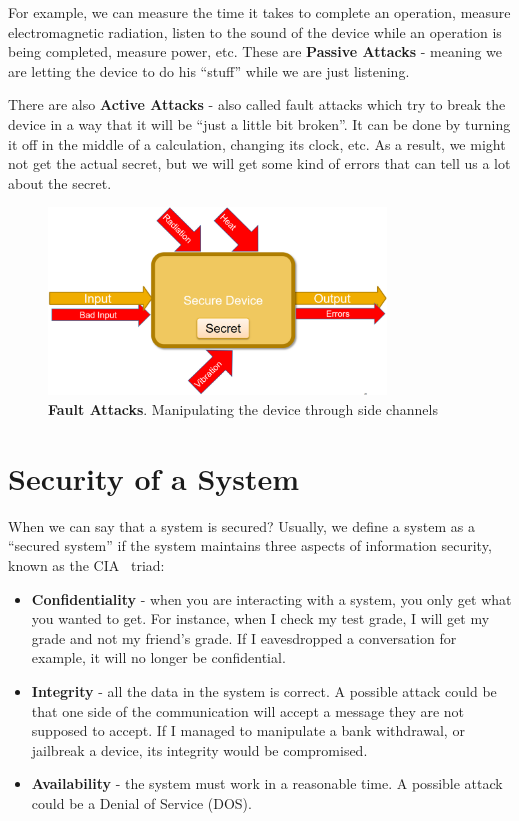 For example, we can measure the time it takes to complete an operation,
measure electromagnetic radiation, listen to the sound of the device while an operation is being completed, measure power, etc. These are \textbf{Passive Attacks} - meaning
we are letting the device to do his ``stuff'' while we are just listening.

There are also \textbf{Active Attacks} - also called fault attacks which try to
break the device in a way that it will be ``just a little bit broken''.
It can be done by turning it off in the middle of a calculation, changing its clock, etc. 
As a result, we might not get the actual secret, but we will get some kind of errors that can tell us a lot about the secret. 

\begin{figure}[!ht]
    \centering
    \includegraphics[width=0.8\textwidth]{images/ch1_Intro/Secure_device3.png}
    \caption{\textbf{Fault Attacks}. Manipulating the device through side channels}
    \label{fig:SecDev3}
\end{figure}

\section{Security of a System} \label{sec:SystemSecurity}

When we can say that a system is secured? Usually, we define a system as a
``secured system'' if the system maintains three aspects of information security,
known as the CIA~\cite{cia} triad:

\begin{itemize}
    \item \textbf{Confidentiality} - when you are interacting with a system, you
    only get what you wanted to get. For instance, when I check my test grade,
    I will get my grade and not my friend's grade. If I eavesdropped a conversation for example, it will no longer be confidential.
    \item \textbf{Integrity} - all the data in the system is correct. A possible
    attack could be that one side of the communication will accept a message
    they are not supposed to accept. If I managed to manipulate a bank withdrawal, or jailbreak a device, its integrity would be compromised.
    \item \textbf{Availability} - the system must work in a reasonable time. A
    possible attack could be a Denial of Service (DOS).
\end{itemize}

